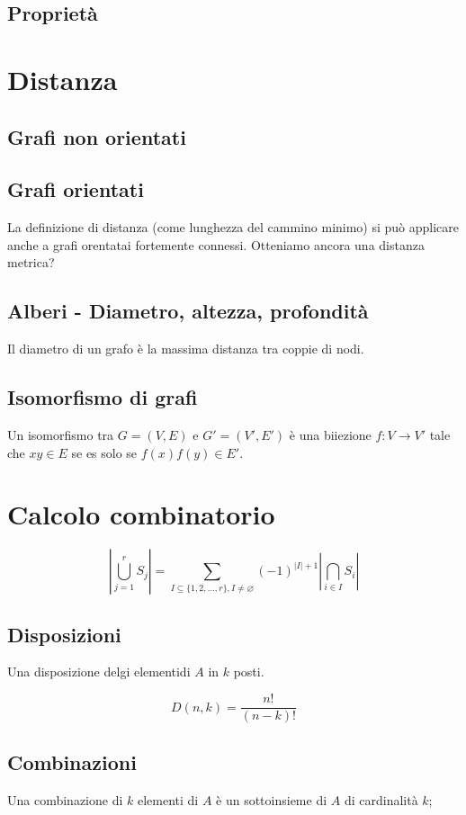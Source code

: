 \documentclass{article}
\begin{document}
\subsection{Proprietà}

\section{Distanza}

\subsection{Grafi non orientati}

\subsection{Grafi orientati}
La definizione di distanza (come lunghezza del cammino minimo) si può applicare anche a grafi orentatai fortemente connessi. Otteniamo ancora una distanza metrica?

\subsection{Alberi - Diametro, altezza, profondità}
Il diametro di un grafo è la massima distanza tra coppie di nodi.


\subsection{Isomorfismo di grafi}
Un isomorfismo tra \(G = (V,E)\) e \(G' = (V',E')\) è una biiezione \(f: V \rightarrow V'\) tale che \(xy \in E\) se es solo se \(f(x)f(y) \in E'\).

\section{Calcolo combinatorio}


\[\left\lvert \bigcup_{j = 1}^r S_j \right\rvert = \sum_{I \subseteq \{1,2,\ldots,r\}, I \neq \varnothing} (-1)^{\lvert I \rvert + 1} \left\lvert \bigcap_{i \in I} S_i \right\rvert \]

\subsection{Disposizioni}
Una disposizione delgi elementidi \(A\) in \(k\) posti.

\[D(n,k) = \frac{n!}{(n-k)!}\]

\subsection{Combinazioni}
Una combinazione di \(k\) elementi di \(A\) è un sottoinsieme di \(A\) di cardinalità \(k\);
\end{document}
